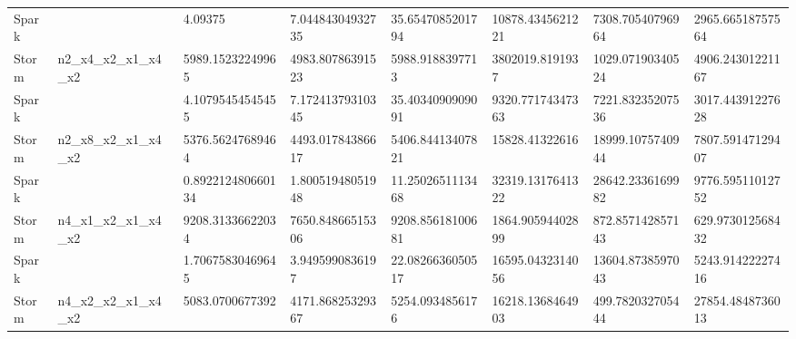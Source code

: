 \documentclass[ppgc,diss,english]{iiufrgs}
\begin{document}
\begin{table}[H]
\begin{tabular}{|l|l|l|l|l|l|l|l|}
Spark    &                                          & 4.09375                                  & 7.04484304932735                         & 35.6547085201794                         & \cellcolor[HTML]{67FD9A}10878.4345621221 & 7308.70540796964                         & \cellcolor[HTML]{67FD9A}2965.66518757564 \\ \cline{1-1} \cline{3-8} 
Storm    & \multirow{-2}{*}{n2\_x4\_x2\_x1\_x4\_x2} & \cellcolor[HTML]{67FD9A}5989.15232249965 & \cellcolor[HTML]{67FD9A}4983.80786391523 & \cellcolor[HTML]{67FD9A}5988.9188397713  & 3802019.8191937                          & \cellcolor[HTML]{67FD9A}1029.07190340524 & 4906.24301221167                         \\ \hline
Spark    &                                          & 4.10795454545455                         & 7.17241379310345                         & 35.4034090909091                         & \cellcolor[HTML]{67FD9A}9320.77174347363 & \cellcolor[HTML]{67FD9A}7221.83235207536 & \cellcolor[HTML]{67FD9A}3017.44391227628 \\ \cline{1-1} \cline{3-8} 
Storm    & \multirow{-2}{*}{n2\_x8\_x2\_x1\_x4\_x2} & \cellcolor[HTML]{67FD9A}5376.56247689464 & \cellcolor[HTML]{67FD9A}4493.01784386617 & \cellcolor[HTML]{67FD9A}5406.84413407821 & 15828.41322616                           & 18999.1075740944                         & 7807.59147129407                         \\ \hline
Spark    &                                          & 0.892212480660134                        & 1.80051948051948                         & 11.2502651113468                         & 32319.1317641322                         & 28642.2336169982                         & 9776.59511012752                         \\ \cline{1-1} \cline{3-8} 
Storm    & \multirow{-2}{*}{n4\_x1\_x2\_x1\_x4\_x2} & \cellcolor[HTML]{67FD9A}9208.31336622034 & \cellcolor[HTML]{67FD9A}7650.84866515306 & \cellcolor[HTML]{67FD9A}9208.85618100681 & \cellcolor[HTML]{67FD9A}1864.90594402899 & \cellcolor[HTML]{67FD9A}872.857142857143 & \cellcolor[HTML]{67FD9A}629.973012568432 \\ \hline
Spark    &                                          & 1.70675830469645                         & 3.9495990836197                          & 22.0826636050517                         & 16595.0432314056                         & 13604.8738597043                         & \cellcolor[HTML]{67FD9A}5243.91422227416 \\ \cline{1-1} \cline{3-8} 
Storm    & \multirow{-2}{*}{n4\_x2\_x2\_x1\_x4\_x2} & \cellcolor[HTML]{67FD9A}5083.0700677392  & \cellcolor[HTML]{67FD9A}4171.86825329367 & \cellcolor[HTML]{67FD9A}5254.0934856176  & \cellcolor[HTML]{67FD9A}16218.1368464903 & \cellcolor[HTML]{67FD9A}499.782032705444 & 27854.4848736013                         \\ \hline

\end{tabular}
\end{table}
\end{document}
